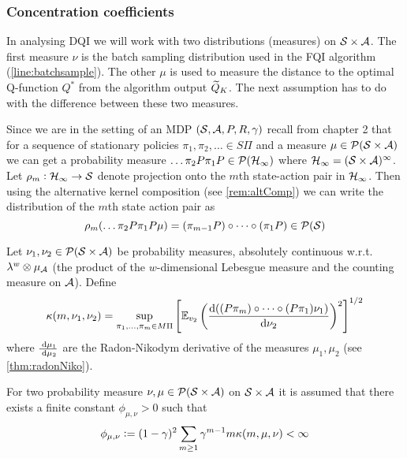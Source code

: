 \subsubsection{Concentration coefficients}

In analysing DQI we will work with two distributions (measures) on $\mathcal{S}
\times \mathcal{A}$.
The first measure $\nu$ is the batch sampling distribution
used in the FQI algorithm (\cref{line:batchsample}). %
The other $\mu$ is used to measure the distance to the optimal Q-function $Q^*$
from the algorithm output $\widetilde{Q}_K$.
The next assumption has to do with the difference between these two measures.

Since we are in the setting of an MDP $(\mathcal{S}, \mathcal{A}, P, R, \gamma)$
recall from chapter 2
that for a sequence of stationary policies $\pi_1, \pi_2, \dots \in S \Pi$ and a
measure $\mu \in \mathcal{P}(\mathcal{S} \times \mathcal{A})$ we can get a probability measure
$\dots \pi_2 P \pi_1 P \in \mathcal{P}(\mathcal{H}_\infty)$ where
$\mathcal{H}_\infty = (\mathcal{S} \times \mathcal{A})^\infty$.
Let $\rho_m:\mathcal{H}_\infty \to \mathcal{S}$
denote projection onto the $m$th state-action pair in
$\mathcal{H}_\infty$.
Then using the alternative kernel composition (see \cref{rem:altComp})
we can write the distribution of the $m$th state action pair as
\[\rho_{m}(\dots \pi_2 P \pi_1 P \mu)
= (\pi_{m-1} P) \circ \dots \circ (\pi_1 P) \in \mathcal{P}(\mathcal{S}) \]


\begin{defn} \label{defn:ccoefs}
  Let $\nu_1, \nu_2 \in \mathcal{P}(\mathcal{S}\times \mathcal{A})$ be probability measures,
  absolutely continuous w.r.t. $\lambda^w \otimes \mu_\mathcal{A}$
  (the product of the $w$-dimensional Lebesgue measure and the counting measure
  on $\mathcal{A}$).
  Define
  \[ \kappa(m, \nu_1, \nu_2) = \sup_{\pi_1, \dots, \pi_m \in M\Pi}
    \left[ \mathbb{E}_{v_2} \left( \frac{\mathrm{d}
	((P \pi_m) \circ \dots \circ (P \pi_1) \nu_1)}
  {\mathrm{d} \nu_2} \right)^2 \right]^{1/2} \]
  where $\frac{\; \mathrm{d} \mu_1}{\; \mathrm{d} \mu_2}$ are the Radon-Nikodym derivative
  of the measures $\mu_1, \mu_2$ (see \cref{thm:radonNiko}).
\end{defn}

\begin{asm}\label{asm:A2}
  For two probability measure $\nu, \mu \in \mathcal{P}(\mathcal{S} \times \mathcal{A})$ 
  on $\mathcal{S} \times \mathcal{A}$
  it is assumed that there exists a finite constant $\phi_{\mu, \nu} > 0$
  such that
  \[ \phi_{\mu, \nu} \vcentcolon= 
    (1 - \gamma)^2 \sum_{m\geq 1} \gamma^{m-1} m \kappa(m, \mu, \nu)
  < \infty \]
\end{asm}

